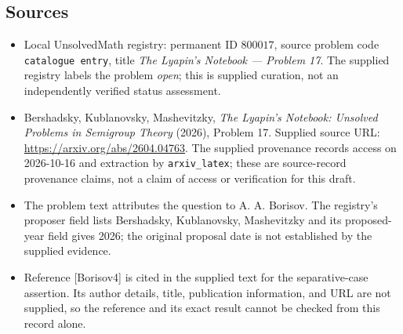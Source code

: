 \documentclass[11pt]{article}
\begin{document}
\subsection{Sources}
\begin{itemize}
\item Local UnsolvedMath registry: permanent ID \(800017\), source problem code \texttt{catalogue entry}, title \emph{The Lyapin's Notebook --- Problem 17}. The supplied registry labels the problem \emph{open}; this is supplied curation, not an independently verified status assessment.
\item Bershadsky, Kublanovsky, Mashevitzky, \emph{The Lyapin's Notebook: Unsolved Problems in Semigroup Theory} (2026), Problem 17. Supplied source URL: \url{https://arxiv.org/abs/2604.04763}. The supplied provenance records access on 2026-10-16 and extraction by \texttt{arxiv\_latex}; these are source-record provenance claims, not a claim of access or verification for this draft.
\item The problem text attributes the question to A. A. Borisov. The registry's proposer field lists Bershadsky, Kublanovsky, Mashevitzky and its proposed-year field gives 2026; the original proposal date is not established by the supplied evidence.
\item Reference [Borisov4] is cited in the supplied text for the separative-case assertion. Its author details, title, publication information, and URL are not supplied, so the reference and its exact result cannot be checked from this record alone.
\end{itemize}
\end{document}
